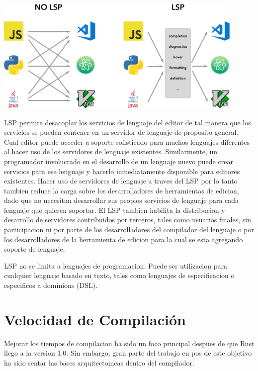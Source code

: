 \documentclass[12pt, a4paper]{report}
\begin{document}
    \noindent
    \includegraphics[width=0.9\textwidth]{lsp}

    LSP permite desacoplar los servicios de lenguaje del editor de tal manera que los servicios se pueden contener en un servidor de lenguaje de proposito general.
    Cual editor puede acceder a soporte sofisticado para muchos lenguajes diferentes al hacer uso de los servidores de lenguaje existentes.
    Similarmente, un programador involucrado en el desarrollo de un lenguaje nuevo puede crear servicios para ese lenguaje y hacerlo inmediatamente disponible para editores existentes.
    Hacer uso de servidores de lenguaje a traves del LSP por lo tanto tambien reduce la carga sobre los desarrolladores de herramientas de edicion, dado que no necesitan desarrollar sus propios servicios de lenguaje para cada lenguaje que quieren soportar.
    El LSP tambien habilita la distribucion y desarrollo de servidores contribuidos por terceros, tales como usuarios finales, sin participacion ni por parte de los desarrolladores del compilador del lenguaje o por los desarrolladores de la herramienta de edicion para la cual se esta agregando soporte de lenguaje.
    \cite{language_server_protocol_wiki}

    LSP no se limita a lenguajes de programacion.
    Puede ser utilizacion para cualquier lenguaje basado en texto, tales como lenguajes de especificacion o especificos a dominions (DSL).
    \cite{language_server_protocol_wiki}

  \section*{Velocidad de Compilación}

    Mejorar los tiempos de compilacion ha sido un foco principal despues de que Rust llego a la version 1.0.
    Sin embargo, gran parte del trabajo en pos de este objetivo ha sido sentar las bases arquitectonicas dentro del compilador.
\end{document}
